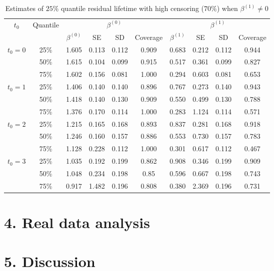 \documentclass[12pt]{article}
\begin{document}
	\begin{table}[H]
		\caption{Estimates of $25\%$ quantile residual lifetime with high censoring ($70\%$) when $\beta^{(1)} \neq 0$}
		\centering
		\begin{tabular}{|c|c|c|c|c|c|c|c|c|c|}
			\hline
			\multirow{2}{*}{$t_0$} & \multirow{2}{*}{Quantile} & \multicolumn{4}{c|}{$\beta^{(0)}$} & \multicolumn{4}{c|}{$\beta^{(1)}$}\\ \cline{3-10}
			& & $\beta^{(0)}$ & SE & SD  & Coverage  & $\beta^{(1)}$ & SE & SD & Coverage\\
			\hline\hline
			\multirow{3}{*}{$t_0=0$} & 25\% & 1.605 & 0.113 & 0.112 & 0.909 & 0.683 & 0.212 & 0.112 & 0.944 \\ 
			& 50\% & 1.615 & 0.104 & 0.099 & 0.915 & 0.517 & 0.361 & 0.099 & 0.827 \\  
			& 75\% & 1.602 & 0.156 & 0.081 & 1.000 & 0.294 & 0.603 & 0.081 & 0.653 \\
			\hline
			\multirow{3}{*}{$t_0=1$} & 25\% & 1.406 & 0.140 & 0.140 & 0.896 & 0.767 & 0.273 & 0.140 & 0.943 \\
			& 50\% & 1.418 & 0.140 & 0.130 & 0.909 & 0.550 & 0.499 & 0.130 & 0.788 \\
			& 75\% & 1.376 & 0.170 & 0.114 & 1.000 & 0.283 & 1.124 & 0.114 & 0.571 \\ 
			\hline
			\multirow{3}{*}{$t_0=2$} & 25\% & 1.215 & 0.165 & 0.168 & 0.893 & 0.837 & 0.281 & 0.168 & 0.918 \\
			& 50\% & 1.246 & 0.160 & 0.157 & 0.886 & 0.553 & 0.730 & 0.157 & 0.783 \\ 
			& 75\% & 1.128 & 0.228 & 0.112 & 1.000 & 0.301 & 0.617 & 0.112 & 0.467 \\ 
			\hline
			\multirow{3}{*}{$t_0=3$} & 25\% & 1.035 & 0.192 & 0.199 & 0.862 & 0.908 & 0.346 & 0.199 & 0.909 \\
			& 50\% & 1.048 & 0.234 & 0.198 & 0.85 & 0.596 & 0.667 & 0.198 & 0.743 \\
			& 75\% & 0.917 & 1.482 & 0.196 & 0.808 & 0.380 & 2.369 & 0.196 & 0.731 \\ 
			\hline
		\end{tabular}
	\end{table}

\section{4. Real data analysis}
	
\section{5. Discussion}
	
\end{document}
